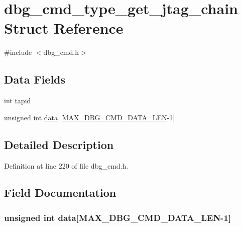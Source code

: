 \hypertarget{structdbg__cmd__type__get__jtag__chain}{\section{dbg\-\_\-cmd\-\_\-type\-\_\-get\-\_\-jtag\-\_\-chain Struct Reference}
\label{structdbg__cmd__type__get__jtag__chain}
}


{\ttfamily \#include $<$dbg\-\_\-cmd.\-h$>$}

\subsection*{Data Fields}
\begin{DoxyCompactItemize}
\item 
int \hyperlink{structdbg__cmd__type__get__jtag__chain_a33e5e67c2641f7f5ca46be79b3222310}{tapid}
\item 
unsigned int \hyperlink{structdbg__cmd__type__get__jtag__chain_abceed6826af53b88f4cc936fac1716f0}{data} \mbox{[}\hyperlink{dbg__cmd_8h_a4552ec15033c8a68870cdf80eda5470c}{M\-A\-X\-\_\-\-D\-B\-G\-\_\-\-C\-M\-D\-\_\-\-D\-A\-T\-A\-\_\-\-L\-E\-N}-\/1\mbox{]}
\end{DoxyCompactItemize}


\subsection{Detailed Description}


Definition at line 220 of file dbg\-\_\-cmd.\-h.



\subsection{Field Documentation}
\hypertarget{structdbg__cmd__type__get__jtag__chain_abceed6826af53b88f4cc936fac1716f0}{
\subsubsection[{data}]{\setlength{\rightskip}{0pt plus 5cm}unsigned int data\mbox{[}{\bf M\-A\-X\-\_\-\-D\-B\-G\-\_\-\-C\-M\-D\-\_\-\-D\-A\-T\-A\-\_\-\-L\-E\-N}-\/1\mbox{]}}}\label{structdbg__cmd__type__get__jtag__chain_abceed6826af53b88f4cc936fac1716f0}



